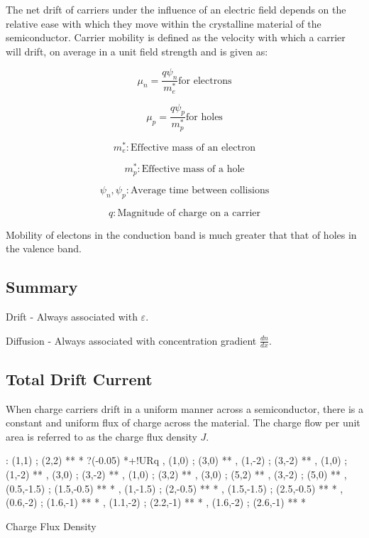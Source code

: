 \documentclass[a4paper,12pt]{article}
\begin{document}
The net drift of carriers under the influence of an electric field
depends on the relative ease with which they move within the crystalline
material of the semiconductor. Carrier mobility is defined as the
velocity with which a carrier will drift, on average in a unit field
strength and is given as:

\[ \mu_{n} = \frac{q \psi_{n}}{m_{e}^{*}} \mbox{for electrons} \]

\[ \mu_{p} = \frac{q \psi_{p}}{m_{p}^{*}} \mbox{for holes} \]

\[ m_{e}^{*} : \mbox{Effective mass of an electron} \]

\[ m_{p}^{*} : \mbox{Effective mass of a hole} \]

\[ \psi_{n}, \psi_{p} : \mbox{Average time between collisions} \]

\[ q : \mbox{Magnitude of charge on a carrier} \]

Mobility of electons in the conduction band is much greater
that that of holes in the valence band.

\subsection{Summary}

Drift - Always associated with $\varepsilon$.

Diffusion - Always associated with concentration gradient
$\frac{dn}{dx}$.

\subsection{Total Drift Current}

When charge carriers drift in a uniform manner across a semiconductor,
there is a constant and uniform flux of charge across the material. The
charge flow per unit area is referred to as the charge flux density $J$.

\begin{table}[hbtp]

\xy <1cm,0cm>:
(1,1) ; (2,2) **\dir{-} *\dir{>} ?(-0.05) *+!UR{q} ,
(1,0) ; (3,0) **\dir{-} ,
(1,-2) ; (3,-2) **\dir{-} ,
(1,0) ; (1,-2) **\dir{-} ,
(3,0) ; (3,-2) **\dir{-} ,
(1,0) ; (3,2) **\dir{-} ,
(3,0) ; (5,2) **\dir{-} ,
(3,-2) ; (5,0) **\dir{-} ,
(0.5,-1.5) ; (1.5,-0.5) **\dir{-} *\dir{>} ,
(1,-1.5) ; (2,-0.5) **\dir{-} *\dir{>} ,
(1.5,-1.5) ; (2.5,-0.5) **\dir{-} *\dir{>} ,
(0.6,-2) ; (1.6,-1) **\dir{-} *\dir{>} ,
(1.1,-2) ; (2.2,-1) **\dir{-} *\dir{>} ,
(1.6,-2) ; (2.6,-1) **\dir{-} *\dir{>}
\endxy

\caption{Charge Flux Density}

\end{table}
\end{document}
